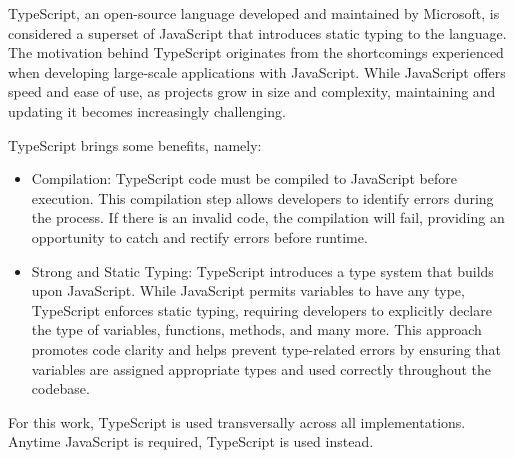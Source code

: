 TypeScript, an open-source language developed and maintained by Microsoft, is considered a superset of JavaScript that introduces static typing to the language.
The motivation behind TypeScript originates from the shortcomings experienced when developing large-scale applications with JavaScript. While JavaScript offers speed and ease of use, as projects grow in size and complexity, maintaining and updating it becomes increasingly challenging.

TypeScript brings some benefits, namely:

\begin{itemize}
  \item Compilation: TypeScript code must be compiled to JavaScript before
    execution. This compilation step allows developers to identify errors
    during the process. If there is an invalid code, the compilation will
    fail, providing an opportunity to catch and rectify errors before
    runtime.

  \item Strong and Static Typing: TypeScript introduces a type system that
    builds upon JavaScript. While JavaScript permits variables to have any
    type, TypeScript enforces static typing, requiring developers to
    explicitly declare the type of variables, functions, methods, and many
    more. This approach promotes code clarity and helps prevent type-related
    errors by ensuring that variables are assigned appropriate types and used
    correctly throughout the codebase.

\end{itemize}

For this work, TypeScript is used transversally across all implementations. Anytime JavaScript is required, TypeScript is used instead.
